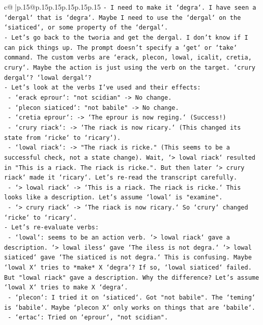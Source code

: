 \documentclass{article}
\begin{document}
{\begin{supertabular}{c@{$\;$}|p{.15\linewidth}@{}p{.15\linewidth}p{.15\linewidth}p{.15\linewidth}p{.15\linewidth}p{.15\linewidth}}
{{{\texttt{{-} I need to make it `degra`. I have seen a `dergal` that is `degra`. Maybe I need to use the `dergal` on the `siaticed`, or some property of the `dergal`.} \\
\texttt{{-} Let's go back to the tworia and get the dergal. I don't know if I can pick things up. The prompt doesn't specify a `get` or `take` command. The custom verbs are `erack, plecon, lowal, icalit, cretia, crury`. Maybe the action is just using the verb on the target. `crury dergal`? `lowal dergal`?} \\
\texttt{{-} Let's look at the verbs I've used and their effects:} \\
\texttt{    {-} `erack eprour`: "not scidian" {-}> No change.} \\
\texttt{    {-} `plecon siaticed`: "not babile" {-}> No change.} \\
\texttt{    {-} `cretia eprour`: {-}> `The eprour is now reging.` (Success!)} \\
\texttt{    {-} `crury riack`: {-}> `The riack is now ricary.` (This changed its state from `ricke` to `ricary`).} \\
\texttt{    {-} `lowal riack`: {-}> "The riack is ricke." (This seems to be a successful check, not a state change). Wait, `> lowal riack` resulted in "This is a riack. The riack is ricke.". But then later `> crury riack` made it `ricary`. Let's re{-}read the transcript carefully.} \\
\texttt{    {-} `> lowal riack` {-}> `This is a riack. The riack is ricke.` This looks like a description. Let's assume `lowal` is "examine".} \\
\texttt{    {-} `> crury riack` {-}> `The riack is now ricary.` So `crury` changed `ricke` to `ricary`.} \\
\texttt{{-} Let's re{-}evaluate verbs:} \\
\texttt{    {-} `lowal`: seems to be an action verb. `> lowal riack` gave a description. `> lowal iless` gave `The iless is not degra.` `> lowal siaticed` gave `The siaticed is not degra.` This is confusing. Maybe `lowal X` tries to *make* X `degra`? If so, `lowal siaticed` failed. But "lowal riack" gave a description. Why the difference? Let's assume `lowal X` tries to make X `degra`.} \\
\texttt{    {-} `plecon`: I tried it on `siaticed`. Got "not babile". The `teming` is `babile`. Maybe `plecon X` only works on things that are `babile`.} \\
\texttt{    {-} `ertac`: Tried on `eprour`, "not scidian".} \\
}}}
\end{supertabular}}
\end{document}
